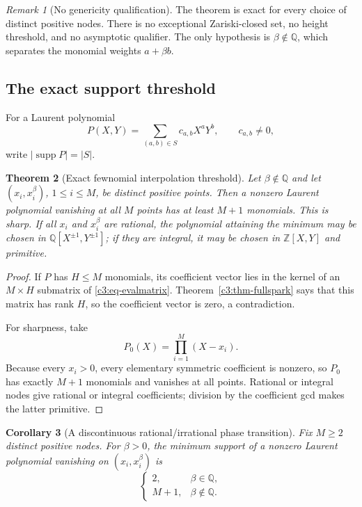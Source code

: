 \documentclass[11pt,oneside]{article}
\newtheorem{theorem}{Theorem}[section]
\newtheorem{corollary}[theorem]{Corollary}
\theoremstyle{definition}
\theoremstyle{remark}
\newtheorem{remark}[theorem]{Remark}
\newcommand{\Z}{\mathbb Z}
\newcommand{\Q}{\mathbb Q}
\newcommand{\supp}{\operatorname{supp}}
\begin{document}
\begin{remark}[No genericity qualification]
The theorem is exact for every choice of distinct positive nodes.  There is no exceptional
Zariski-closed set, no height threshold, and no asymptotic qualifier.  The only hypothesis is
$\beta\notin\Q$, which separates the monomial weights $a+\beta b$.
\end{remark}

\subsection{The exact support threshold}

For a Laurent polynomial
\[
 P(X,Y)=\sum_{(a,b)\in S}c_{a,b}X^aY^b,
 \qquad c_{a,b}\ne0,
\]
write $|\supp P|=|S|$.

\begin{theorem}[Exact fewnomial interpolation threshold]
\label{c3:thm-support-threshold}
Let $\beta\notin\Q$ and let $(x_i,x_i^\beta)$, $1\le i\le M$, be distinct positive points.
Then a nonzero Laurent polynomial vanishing at all $M$ points has at least $M+1$ monomials.
This is sharp.  If all $x_i$ and $x_i^\beta$ are rational, the polynomial attaining the
minimum may be chosen in $\Q[X^{\pm1},Y^{\pm1}]$; if they are integral, it may be chosen in
$\Z[X,Y]$ and primitive.
\end{theorem}

\begin{proof}
If $P$ has $H\le M$ monomials, its coefficient vector lies in the kernel of an
$M\times H$ submatrix of \eqref{c3:eq-evalmatrix}.  Theorem~\ref{c3:thm-fullspark} says that
this matrix has rank $H$, so the coefficient vector is zero, a contradiction.

For sharpness, take
\[
 P_0(X)=\prod_{i=1}^{M}(X-x_i).
\]
Because every $x_i>0$, every elementary symmetric coefficient is nonzero, so $P_0$ has
exactly $M+1$ monomials and vanishes at all points.  Rational or integral nodes give rational
or integral coefficients; division by the coefficient gcd makes the latter primitive.
\end{proof}

\begin{corollary}[A discontinuous rational/irrational phase transition]
\label{c3:cor-phase-transition}
Fix $M\ge2$ distinct positive nodes.  For $\beta>0$, the minimum support of a nonzero Laurent
polynomial vanishing on $(x_i,x_i^\beta)$ is
\[
 \begin{cases}
  2,&\beta\in\Q,\\
  M+1,&\beta\notin\Q.
 \end{cases}
\]
\end{corollary}
\end{document}
